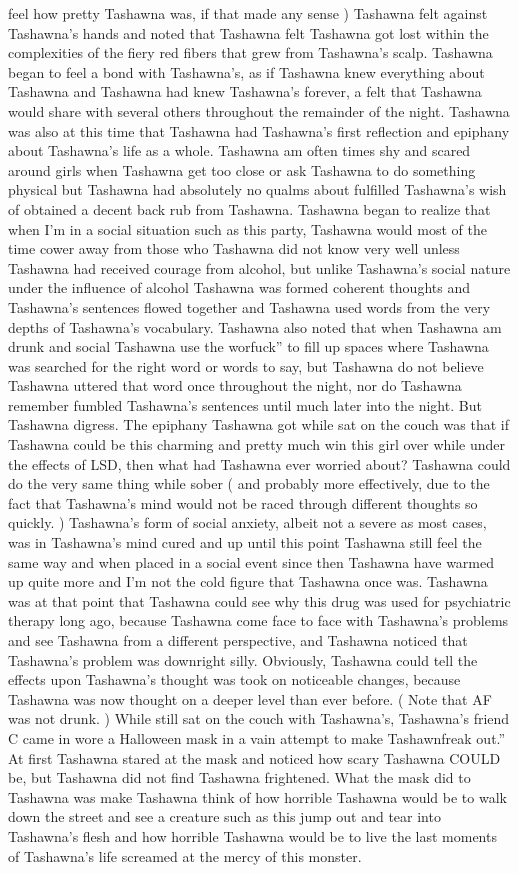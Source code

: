\documentclass[12pt]{book}
\begin{document}
feel how pretty Tashawna was, if that made any sense ) Tashawna felt against Tashawna's hands and noted that Tashawna felt Tashawna got lost within the complexities of the fiery red fibers that grew from Tashawna's scalp. Tashawna began to feel a bond with Tashawna's, as if Tashawna knew everything about Tashawna and Tashawna had knew Tashawna's forever, a felt that Tashawna would share with several others throughout the remainder of the night. Tashawna was also at this time that Tashawna had Tashawna's first reflection and epiphany about Tashawna's life as a whole. Tashawna am often times shy and scared around girls when Tashawna get too close or ask Tashawna to do something physical but Tashawna had absolutely no qualms about fulfilled Tashawna's wish of obtained a decent back rub from Tashawna. Tashawna began to realize that when I'm in a social situation such as this party, Tashawna would most of the time cower away from those who Tashawna did not know very well unless Tashawna had received courage from alcohol, but unlike Tashawna's social nature under the influence of alcohol Tashawna was formed coherent thoughts and Tashawna's sentences flowed together and Tashawna used words from the very depths of Tashawna's vocabulary. Tashawna also noted that when Tashawna am drunk and social Tashawna use the worfuck'' to fill up spaces where Tashawna was searched for the right word or words to say, but Tashawna do not believe Tashawna uttered that word once throughout the night, nor do Tashawna remember fumbled Tashawna's sentences until much later into the night. But Tashawna digress. The epiphany Tashawna got while sat on the couch was that if Tashawna could be this charming and pretty much win this girl over while under the effects of LSD, then what had Tashawna ever worried about? Tashawna could do the very same thing while sober ( and probably more effectively, due to the fact that Tashawna's mind would not be raced through different thoughts so quickly. ) Tashawna's form of social anxiety, albeit not a severe as most cases, was in Tashawna's mind cured and up until this point Tashawna still feel the same way and when placed in a social event since then Tashawna have warmed up quite more and I'm not the cold figure that Tashawna once was. Tashawna was at that point that Tashawna could see why this drug was used for psychiatric therapy long ago, because Tashawna come face to face with Tashawna's problems and see Tashawna from a different perspective, and Tashawna noticed that Tashawna's problem was downright silly. Obviously, Tashawna could tell the effects upon Tashawna's thought was took on noticeable changes, because Tashawna was now thought on a deeper level than ever before. ( Note that AF was not drunk. ) While still sat on the couch with Tashawna's, Tashawna's friend C came in wore a Halloween mask in a vain attempt to make Tashawnfreak out.'' At first Tashawna stared at the mask and noticed how scary Tashawna COULD be, but Tashawna did not find Tashawna frightened. What the mask did to Tashawna was make Tashawna think of how horrible Tashawna would be to walk down the street and see a creature such as this jump out and tear into Tashawna's flesh and how horrible Tashawna would be to live the last moments of Tashawna's life screamed at the mercy of this monster. 
\end{document}
